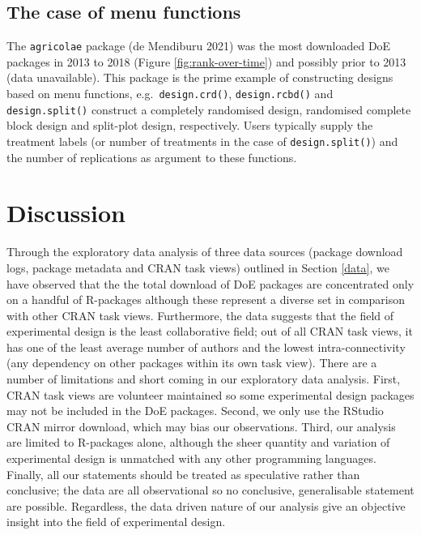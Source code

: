\documentclass{article}
\begin{document}
\hypertarget{the-case-of-menu-functions}{%
\subsection{The case of menu
functions}\label{the-case-of-menu-functions}}

The \texttt{agricolae} package (de Mendiburu 2021) was the most
downloaded DoE packages in 2013 to 2018 (Figure
\ref{fig:rank-over-time}) and possibly prior to 2013 (data unavailable).
This package is the prime example of constructing designs based on menu
functions, e.g.~\texttt{design.crd()}, \texttt{design.rcbd()} and
\texttt{design.split()} construct a completely randomised design,
randomised complete block design and split-plot design, respectively.
Users typically supply the treatment labels (or number of treatments in
the case of \texttt{design.split()}) and the number of replications as
argument to these functions.

\hypertarget{discussion}{%
\section{Discussion}\label{discussion}}

Through the exploratory data analysis of three data sources (package
download logs, package metadata and CRAN task views) outlined in Section
\ref{data}, we have observed that the the total download of DoE packages
are concentrated only on a handful of R-packages although these
represent a diverse set in comparison with other CRAN task views.
Furthermore, the data suggests that the field of experimental design is
the least collaborative field; out of all CRAN task views, it has one of
the least average number of authors and the lowest intra-connectivity
(any dependency on other packages within its own task view). There are a
number of limitations and short coming in our exploratory data analysis.
First, CRAN task views are volunteer maintained so some experimental
design packages may not be included in the DoE packages. Second, we only
use the RStudio CRAN mirror download, which may bias our observations.
Third, our analysis are limited to R-packages alone, although the sheer
quantity and variation of experimental design is unmatched with any
other programming languages. Finally, all our statements should be
treated as speculative rather than conclusive; the data are all
observational so no conclusive, generalisable statement are possible.
Regardless, the data driven nature of our analysis give an objective
insight into the field of experimental design.
\end{document}
